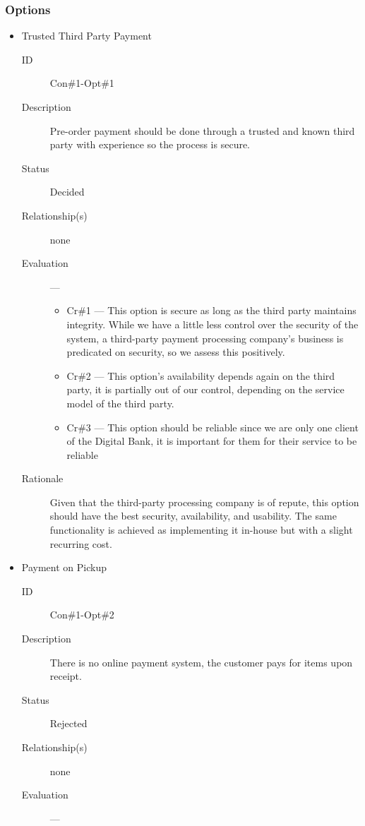 \documentclass[11pt]{article}
\begin{document}
\subsubsection*{Options}
\label{sec:org34ec2f8}
\begin{itemize}
\item Trusted Third Party Payment
\label{sec:orgb082640}
\begin{description}
\item[{ID}] Con\#1-Opt\#1
\item[{Description}] Pre-order payment should be done through a
trusted and known third party with experience so
the process is secure.
\item[{Status}] Decided
\item[{Relationship(s)}] none
\item[{Evaluation}] ---
\begin{itemize}
\item Cr\#1 --- This option is secure as long as the
third party maintains integrity. While we have a little less
control over the security of the system, a third-party
payment processing company's business is predicated on
security, so we assess this positively.
\item Cr\#2 --- This option's availability depends again on the
third party, it is partially out of our control, depending on
the service model of the third party.
\item Cr\#3 --- This option should be reliable since we are only one
client of the Digital Bank, it is important for
them for their service to be reliable
\end{itemize}
\item[{Rationale}] Given that the third-party processing company is
of repute, this option should have the best
security, availability, and usability. The same
functionality is achieved as implementing it
in-house but with a slight recurring cost.
\end{description}
\item Payment on Pickup
\label{sec:org702c86d}
\begin{description}
\item[{ID}] Con\#1-Opt\#2
\item[{Description}] There is no online payment system, the customer
pays for items upon receipt.
\item[{Status}] Rejected
\item[{Relationship(s)}] none
\item[{Evaluation}] ---
\begin{itemize}

\end{itemize}
\end{description}
\end{itemize}
\end{document}
